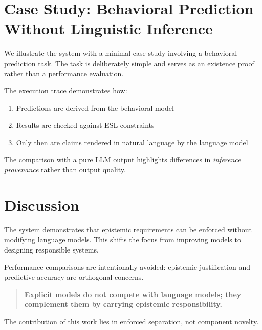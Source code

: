 \documentclass[11pt,a4paper]{article}
\begin{document}
\section{Case Study: Behavioral Prediction Without Linguistic Inference}

We illustrate the system with a minimal case study involving a behavioral prediction task. The task is deliberately simple and serves as an existence proof rather than a performance evaluation.

The execution trace demonstrates how:
\begin{enumerate}
    \item Predictions are derived from the behavioral model
    \item Results are checked against ESL constraints
    \item Only then are claims rendered in natural language by the language model
\end{enumerate}

The comparison with a pure LLM output highlights differences in \emph{inference provenance} rather than output quality.


\section{Discussion}

The system demonstrates that epistemic requirements can be enforced without modifying language models. This shifts the focus from improving models to designing responsible systems.

Performance comparisons are intentionally avoided: epistemic justification and predictive accuracy are orthogonal concerns.

\begin{quote}
\textbf{Explicit models do not compete with language models; they complement them by carrying epistemic responsibility.}
\end{quote}

The contribution of this work lies in enforced separation, not component novelty.


\end{document}
